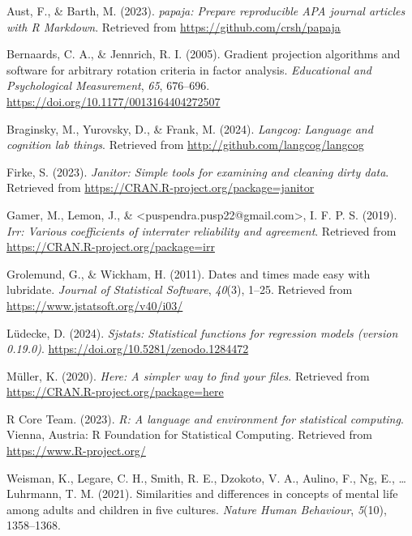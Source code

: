 \documentclass[
  man]{apa6}
\newlength{\cslhangindent}
\newlength{\cslentryspacingunit} %
\newenvironment{CSLReferences}[2] %
 {%
  \setlength{\parindent}{0pt}
  \ifodd #1
  \let\oldpar\par
  \def\par{\hangindent=\cslhangindent\oldpar}
  \fi
  \setlength{\parskip}{#2\cslentryspacingunit}
 }%
 {}
\begin{document}
\hypertarget{refs}{}
\begin{CSLReferences}{1}{0}
\leavevmode{}%
Aust, F., \& Barth, M. (2023). \emph{{papaja}: {Prepare} reproducible {APA} journal articles with {R Markdown}}. Retrieved from \url{https://github.com/crsh/papaja}

\leavevmode{}%
Bernaards, C. A., \& Jennrich, R. I. (2005). Gradient projection algorithms and software for arbitrary rotation criteria in factor analysis. \emph{Educational and Psychological Measurement}, \emph{65}, 676--696. \url{https://doi.org/10.1177/0013164404272507}

\leavevmode{}%
Braginsky, M., Yurovsky, D., \& Frank, M. (2024). \emph{Langcog: Language and cognition lab things}. Retrieved from \url{http://github.com/langcog/langcog}

\leavevmode{}%
Firke, S. (2023). \emph{Janitor: Simple tools for examining and cleaning dirty data}. Retrieved from \url{https://CRAN.R-project.org/package=janitor}

\leavevmode{}%
Gamer, M., Lemon, J., \& \textless puspendra.pusp22@gmail.com\textgreater, I. F. P. S. (2019). \emph{Irr: Various coefficients of interrater reliability and agreement}. Retrieved from \url{https://CRAN.R-project.org/package=irr}

\leavevmode{}%
Grolemund, G., \& Wickham, H. (2011). Dates and times made easy with {lubridate}. \emph{Journal of Statistical Software}, \emph{40}(3), 1--25. Retrieved from \url{https://www.jstatsoft.org/v40/i03/}

\leavevmode{}%
Lüdecke, D. (2024). \emph{Sjstats: Statistical functions for regression models (version 0.19.0)}. \url{https://doi.org/10.5281/zenodo.1284472}

\leavevmode{}%
Müller, K. (2020). \emph{Here: A simpler way to find your files}. Retrieved from \url{https://CRAN.R-project.org/package=here}

\leavevmode{}%
R Core Team. (2023). \emph{R: A language and environment for statistical computing}. Vienna, Austria: R Foundation for Statistical Computing. Retrieved from \url{https://www.R-project.org/}

\leavevmode{}%
Weisman, K., Legare, C. H., Smith, R. E., Dzokoto, V. A., Aulino, F., Ng, E., \ldots{} Luhrmann, T. M. (2021). Similarities and differences in concepts of mental life among adults and children in five cultures. \emph{Nature Human Behaviour}, \emph{5}(10), 1358--1368.


\end{CSLReferences}
\end{document}
